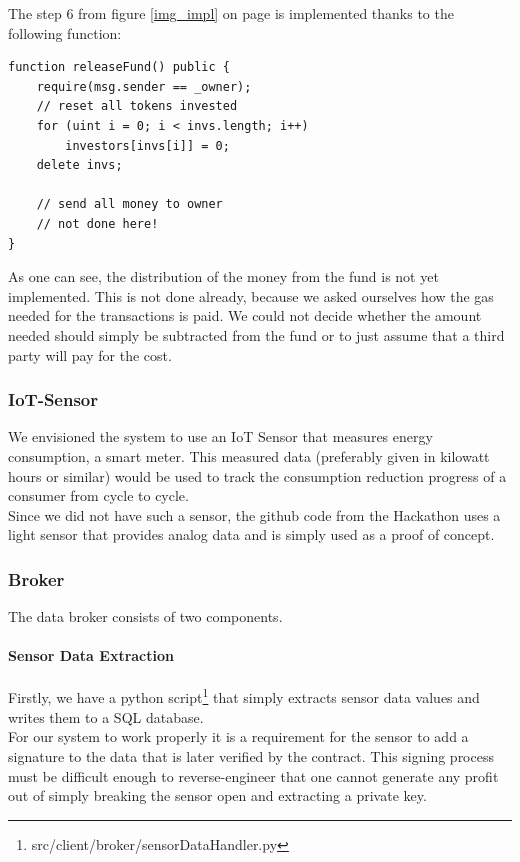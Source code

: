 \documentclass[11pt]{article}
\begin{document}
The step 6 from figure \ref{img_impl} on page \pageref{img_impl} is implemented thanks to the following function:
\begin{lstlisting}[language=Solidity, firstnumber=17,caption={src/smartcontracts/contracts/Fund.sol},captionpos=b]
function releaseFund() public {
	require(msg.sender == _owner);
	// reset all tokens invested
	for (uint i = 0; i < invs.length; i++)
	    investors[invs[i]] = 0;
	delete invs;
	
	// send all money to owner
	// not done here!
}
\end{lstlisting}
As one can see, the distribution of the money from the fund is not yet implemented. This is not done already, because we asked ourselves how the gas needed for the transactions is paid. We could not decide whether the amount needed should simply be subtracted from the fund or to just assume that a third party will pay for the cost.
\subsubsection{IoT-Sensor}
We envisioned the system to use an IoT Sensor that measures energy consumption, a smart meter. This measured data (preferably given in kilowatt hours or similar) would be used to track the consumption reduction progress of a consumer from cycle to cycle. \\
Since we did not have such a sensor, the github code from the Hackathon uses a light sensor that provides analog data and is simply used as a proof of concept.

\subsubsection{Broker}
The data broker consists of two components.
\paragraph{Sensor Data Extraction}
Firstly, we have a python script\footnote{src/client/broker/sensorDataHandler.py} that simply extracts sensor data values and writes them to a SQL database. \\
For our system to work properly it is a requirement for the sensor to add a signature to the data that is later verified by the contract. This signing process must be difficult enough to reverse-engineer that one cannot generate any profit out of simply breaking the sensor open and extracting a private key.
\end{document}
